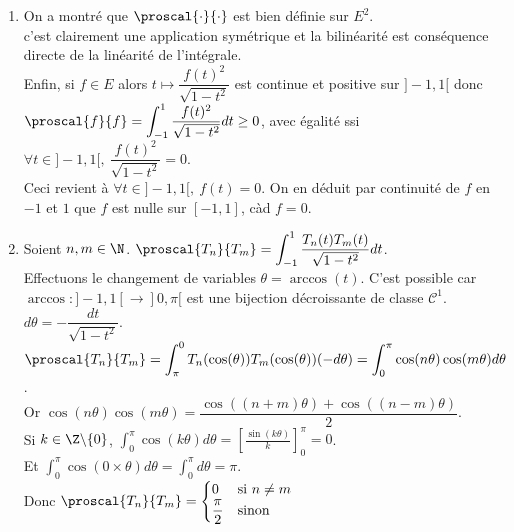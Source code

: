 \documentclass{book}
\begin{document}
\begin{enumerate}[leftmargin=*]
\begin{enumerate}[label=\alph*.]
			De même, $H(t)\underset{t\to-1^+}=\bigO{\dfrac{1}{(1+t)^{1/2}}}$ donc $H$ est intégrable en $-1^+$.\\
			Finalement $H$ est intégrable sur $]-1,1[$.\\
			Pour tout $f,g\in E$, $fg\in E$ donc $t\mapsto \dfrac{f(t)g(t)}{\sqrt{1-t^2}}$ est intégrable sur $]-1,1[$.
			\item On a montré que $\proscal{\cdot}{\cdot}$ est bien définie sur $E^2$.\\
			c'est clairement une application symétrique et la bilinéarité est conséquence directe de la linéarité de l'intégrale.\\
			Enfin, si $f\in E$ alors $t\mapsto \dfrac{f(t)^2}{\sqrt{1-t^2}}$ est continue et positive sur $]-1,1[$ donc $\proscal{f}{f}=\displaystyle\int_{-1}^1\frac{f(t)^2}{\sqrt{1-t^2}}dt\geq 0$, avec égalité ssi $\forall t\in ]-1,1[,\ \dfrac{f(t)^2}{\sqrt{1-t^2}}=0$.\\
			Ceci revient à $\forall t\in ]-1,1[,\ f(t)=0$. On en déduit par continuité de $f$ en $-1$ et $1$ que $f$ est nulle sur $[-1,1]$, càd $f=0$.
			\item Soient $n,m\in \N$. $\proscal{T_n}{T_m}=\displaystyle\int_{-1}^1\frac{T_n(t)T_m(t)}{\sqrt{1-t^2}}dt$.\\
			Effectuons le changement de variables $\theta=\arccos(t)$. C'est possible car $\arccos:]-1,1[\to]0,\pi[$ est une bijection décroissante de classe $\mathcal C^1$. $d\theta=-\dfrac{dt}{\sqrt{1-t^2}}$.\\
			$\proscal{T_n}{T_m}=\displaystyle\int_\pi^0T_n(\cos(\theta))T_m(\cos(\theta))(-d\theta)=\int_0^\pi\cos(n\theta)\cos(m\theta)d\theta$.\\
			Or $\cos(n\theta)\cos(m\theta)=\dfrac{\cos((n+m)\theta)+\cos((n-m)\theta)}{2}$.\\
			Si $k\in\Z\backslash\{0\}$, $\displaystyle\int_0^\pi\cos(k\theta)d\theta=\left[\frac{\sin(k\theta)}{k}\right]_0^\pi=0$.\\
			Et $\displaystyle\int_0^\pi\cos(0\times\theta)d\theta=\int_0^\pi d\theta=\pi$.\\
			Donc $\proscal{T_n}{T_m}=\begin{cases}
				0&\mbox{si }n\ne m\\
				\dfrac{\pi}{2}&\mbox{sinon}
			\end{cases}$
		\end{enumerate}
	\end{enumerate}
	
\end{document}
